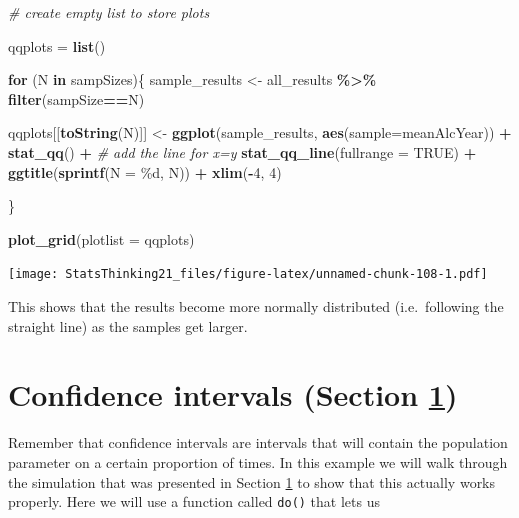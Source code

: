 \documentclass[
  12pt,
]{book}
\newenvironment{Shaded}{\begin{snugshade}}{\end{snugshade}}
\newcommand{\AttributeTok}[1]{\textcolor[rgb]{0.13,0.29,0.53}{#1}}
\newcommand{\CommentTok}[1]{\textcolor[rgb]{0.56,0.35,0.01}{\textit{#1}}}
\newcommand{\ConstantTok}[1]{\textcolor[rgb]{0.56,0.35,0.01}{#1}}
\newcommand{\ControlFlowTok}[1]{\textcolor[rgb]{0.13,0.29,0.53}{\textbf{#1}}}
\newcommand{\DecValTok}[1]{\textcolor[rgb]{0.00,0.00,0.81}{#1}}
\newcommand{\FunctionTok}[1]{\textcolor[rgb]{0.13,0.29,0.53}{\textbf{#1}}}
\newcommand{\NormalTok}[1]{#1}
\newcommand{\OtherTok}[1]{\textcolor[rgb]{0.56,0.35,0.01}{#1}}
\newcommand{\SpecialCharTok}[1]{\textcolor[rgb]{0.81,0.36,0.00}{\textbf{#1}}}
\newcommand{\StringTok}[1]{\textcolor[rgb]{0.31,0.60,0.02}{#1}}
\begin{document}
\begin{Shaded}
\begin{Highlighting}[]
\CommentTok{\# create empty list to store plots}

\NormalTok{qqplots }\OtherTok{=} \FunctionTok{list}\NormalTok{()}

\ControlFlowTok{for}\NormalTok{ (N }\ControlFlowTok{in}\NormalTok{ sampSizes)\{}
\NormalTok{  sample\_results }\OtherTok{\textless{}{-}} 
\NormalTok{    all\_results }\SpecialCharTok{\%\textgreater{}\%}
    \FunctionTok{filter}\NormalTok{(sampSize}\SpecialCharTok{==}\NormalTok{N)}

\NormalTok{  qqplots[[}\FunctionTok{toString}\NormalTok{(N)]] }\OtherTok{\textless{}{-}} \FunctionTok{ggplot}\NormalTok{(sample\_results, }
                                \FunctionTok{aes}\NormalTok{(}\AttributeTok{sample=}\NormalTok{meanAlcYear)) }\SpecialCharTok{+}
    \FunctionTok{stat\_qq}\NormalTok{() }\SpecialCharTok{+} 
    \CommentTok{\# add the line for x=y}
    \FunctionTok{stat\_qq\_line}\NormalTok{(}\AttributeTok{fullrange =} \ConstantTok{TRUE}\NormalTok{) }\SpecialCharTok{+} 
    \FunctionTok{ggtitle}\NormalTok{(}\FunctionTok{sprintf}\NormalTok{(}\StringTok{\textquotesingle{}N = \%d\textquotesingle{}}\NormalTok{, N)) }\SpecialCharTok{+} 
   \FunctionTok{xlim}\NormalTok{(}\SpecialCharTok{{-}}\DecValTok{4}\NormalTok{, }\DecValTok{4}\NormalTok{) }

\NormalTok{\}}

\FunctionTok{plot\_grid}\NormalTok{(}\AttributeTok{plotlist =}\NormalTok{ qqplots)}
\end{Highlighting}
\end{Shaded}

\texttt{[image: StatsThinking21\_files/figure-latex/unnamed-chunk-108-1.pdf]}

This shows that the results become more normally distributed (i.e.~following the straight line) as the samples get larger.

\hypertarget{confidence-intervals}{%
\section{Confidence intervals (Section \ref{confidence-intervals})}\label{confidence-intervals}}

Remember that confidence intervals are intervals that will contain the population parameter on a certain proportion of times. In this example we will walk through the simulation that was presented in Section \ref{confidence-intervals} to show that this actually works properly. Here we will use a function called \texttt{do()} that lets us
\end{document}
